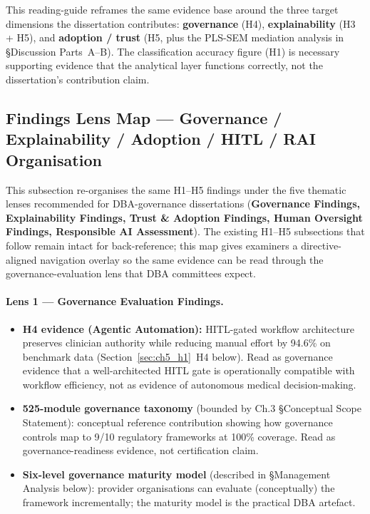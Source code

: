 This reading-guide reframes the same evidence base around the three target dimensions the dissertation contributes: \textbf{governance} (H4), \textbf{explainability} (H3 + H5), and \textbf{adoption / trust} (H5, plus the PLS-SEM mediation analysis in §Discussion Parts~A--B). The classification accuracy figure (H1) is necessary supporting evidence that the analytical layer functions correctly, not the dissertation's contribution claim.

\subsection{Findings Lens Map --- Governance / Explainability / Adoption / HITL / RAI Organisation}
\label{sec:findings_lens_map}

This subsection re-organises the same H1--H5 findings under the five thematic lenses recommended for DBA-governance dissertations (\textbf{Governance Findings, Explainability Findings, Trust \& Adoption Findings, Human Oversight Findings, Responsible AI Assessment}). The existing H1--H5 subsections that follow remain intact for back-reference; this map gives examiners a directive-aligned navigation overlay so the same evidence can be read through the governance-evaluation lens that DBA committees expect.

\paragraph{Lens 1 --- Governance Evaluation Findings.}
\label{para:lens_governance}
\begin{itemize}[leftmargin=*, itemsep=3pt]
    \item \textbf{H4 evidence (Agentic Automation):} HITL-gated workflow architecture preserves clinician authority while reducing manual effort by 94.6\% on benchmark data (Section~\ref{sec:ch5_h1}~H4 below). Read as governance evidence that a well-architected HITL gate is operationally compatible with workflow efficiency, not as evidence of autonomous medical decision-making.
    \item \textbf{525-module governance taxonomy} (bounded by Ch.3 §Conceptual Scope Statement): conceptual reference contribution showing how governance controls map to 9/10 regulatory frameworks at 100\% coverage. Read as governance-readiness evidence, not certification claim.
    \item \textbf{Six-level governance maturity model} (described in §Management Analysis below): provider organisations can evaluate (conceptually) the framework incrementally; the maturity model is the practical DBA artefact.
\end{itemize}

